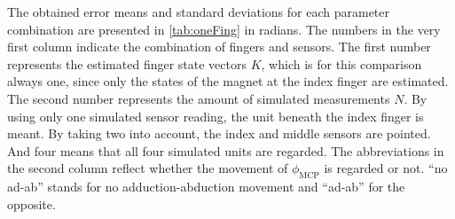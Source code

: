 The obtained error means and standard deviations for each parameter combination are presented in \ref{tab:oneFing} in radians. The numbers in the very first column indicate the combination of fingers and sensors. The first number represents the estimated finger state vectors $ K $, which is for this comparison always one, since only the states of the magnet at the index finger are estimated. The second number represents the amount of simulated measurements $ N $. By using only one simulated sensor reading, the unit beneath the index finger is meant. By taking two into account, the index and middle sensors are pointed. And four means that all four simulated units are regarded. The abbreviations in the second column reflect whether the movement of $ \phi_{\mathrm{MCP}} $ is regarded or not. ``no ad-ab'' stands for no adduction-abduction movement and ``ad-ab'' for the opposite. 
